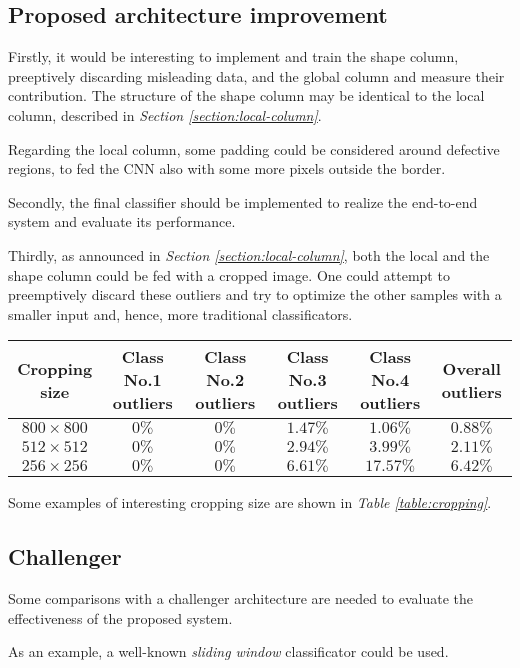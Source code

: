     \subsection{Proposed architecture improvement}
    \par{
        Firstly, it would be interesting to implement and train the shape column, preeptively discarding misleading data, and the global column and measure their contribution. The structure of the shape column may be identical to the local column, described in \emph{Section \ref{section:local-column}}.
    }
    \par{
        Regarding the local column, some padding could be considered around defective regions, to fed the CNN also with some more pixels outside the border.
    }
    \par{
        Secondly, the final classifier should be implemented to realize the end-to-end system and evaluate its performance.
    }
    \par{
        Thirdly, as announced in \emph{Section \ref{section:local-column}}, both the local and the shape column could be fed with a cropped image. One could attempt to preemptively discard these outliers and try to optimize the other samples with a smaller input and, hence, more traditional classificators.
    }
    \begin{table*}
        \centering
        \normalsize
        \begin{tabular}{|c|c|c|c|c|c|}
            \hline
            \textbf{Cropping size} & \textbf{Class No.1 outliers} & \textbf{Class No.2 outliers}& \textbf{Class No.3 outliers} & \textbf{Class No.4 outliers} & \textbf{Overall outliers}\\\hline
            $800\times 800$ & $0\%$ & $0\%$ & $1.47\%$ & $1.06\%$ & $0.88\%$\\
            $512\times 512$ & $0\%$ & $0\%$ & $2.94\%$ & $3.99\%$ & $2.11\%$\\
            $256\times 256$ & $0\%$ & $0\%$ & $6.61\%$ & $17.57\%$& $6.42\%$\\
            \hline
        \end{tabular}
        \vspace{0.5cm}
        \caption{Cropping examples.}\label{table:cropping}
    \end{table*}
    \par{
        Some examples of interesting cropping size are shown in \emph{Table \ref{table:cropping}}.
    }
    \subsection{Challenger}
    \par{
        Some comparisons with a challenger architecture are needed to evaluate the effectiveness of the proposed system.
    }
    \par{
        As an example, a well-known \emph{sliding window} classificator could be used.
    }
